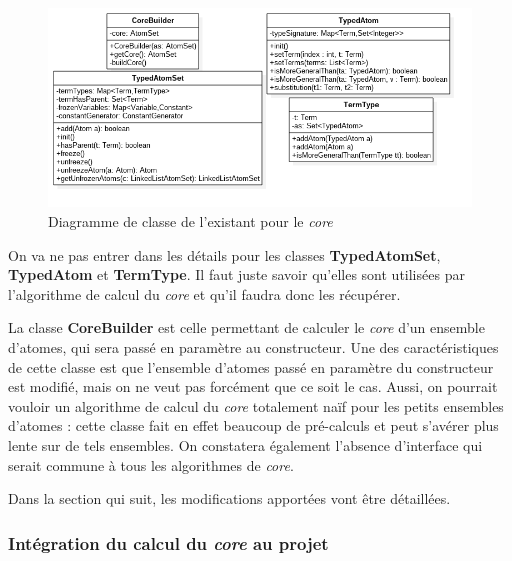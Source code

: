         \begin{figure}[H]
        \centering
        \vspace{-10pt}
        \includegraphics[width=\textwidth]{pictures/diag_classe_existant_core.png}
        \vspace{-35pt}
        \caption{Diagramme de classe de l'existant pour le \textit{core}}
        \vspace{-5pt}
        \label{fig:dclasse_existant_core}
        \end{figure}
     \par On va ne pas entrer dans les détails pour les classes \textbf{TypedAtomSet}, \textbf{TypedAtom} et \textbf{TermType}. Il faut juste savoir qu'elles sont utilisées par l'algorithme de calcul du \textit{core} et qu'il faudra donc les récupérer.
     \par La classe \textbf{CoreBuilder} est celle permettant de calculer le \textit{core} d'un ensemble d'atomes, qui sera passé en paramètre au constructeur. Une des caractéristiques de cette classe est que l'ensemble d'atomes passé en paramètre du constructeur est modifié, mais on ne veut pas forcément que ce soit le cas. Aussi, on pourrait vouloir un algorithme de calcul du \textit{core} totalement naïf pour les petits ensembles d'atomes : cette classe fait en effet beaucoup de pré-calculs et peut s'avérer plus lente sur de tels ensembles. On constatera également l'absence d'interface qui serait commune à tous les algorithmes de \textit{core}.
     \par Dans la section qui suit, les modifications apportées vont être détaillées.
     
    \subsubsection{Intégration du calcul du \textit{core} au projet}\label{subsubsec:integration_core}
    
